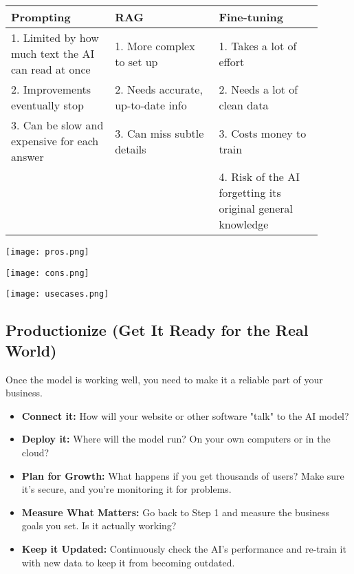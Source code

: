 \begin{tcolorbox}[title=Cons: The Downsides, boxrule=1pt, sharp corners]
\begin{tabular}{p{0.3\linewidth} | p{0.3\linewidth} | p{0.3\linewidth}}
    \textbf{Prompting} & \textbf{RAG} & \textbf{Fine-tuning} \\
    \hline
    1. Limited by how much text the AI can read at once & 1. More complex to set up & 1. Takes a lot of effort \\
    2. Improvements eventually stop & 2. Needs accurate, up-to-date info & 2. Needs a lot of clean data \\
    3. Can be slow and expensive for each answer & 3. Can miss subtle details & 3. Costs money to train \\
     &  & 4. Risk of the AI forgetting its original general knowledge \\
\end{tabular}
\end{tcolorbox}

\begin{center}
\texttt{[image: pros.png]}
\end{center}


\begin{center}
\texttt{[image: cons.png]}
\end{center}


\begin{center}
\texttt{[image: usecases.png]}
\end{center}

\newpage
\subsection{Productionize (Get It Ready for the Real World)}
Once the model is working well, you need to make it a reliable part of your business.

\begin{itemize}
    \item \textbf{Connect it:} How will your website or other software "talk" to the AI model?
    \item \textbf{Deploy it:} Where will the model run? On your own computers or in the cloud?
    \item \textbf{Plan for Growth:} What happens if you get thousands of users? Make sure it's secure, and you're monitoring it for problems.
    \item \textbf{Measure What Matters:} Go back to Step 1 and measure the business goals you set. Is it actually working?
    \item \textbf{Keep it Updated:} Continuously check the AI's performance and re-train it with new data to keep it from becoming outdated.
\end{itemize}


